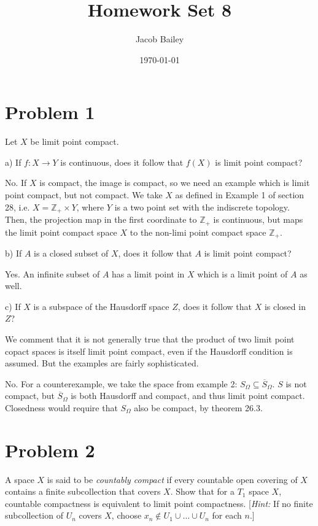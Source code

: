 \documentclass[11pt]{article}
\author{Jacob Bailey}
\date{\today}
\title{Homework Set 8}
\begin{document}
\maketitle
\section{Problem 1}
\label{sec:org7a49c94}
Let \(X\) be limit point compact. 

a) If \(f: X\rightarrow Y\) is continuous, does it follow that \(f(X)\) is limit
point compact? 

No. If \(X\) is compact, the image is compact, so we need an example which is
limit point compact, but not compact. We take \(X\) as defined in Example 1 of
section 28, i.e. \(X = \mathbb{Z}_+\times Y\), where \(Y\) is a two point set with
the indiscrete topology. Then, the projection map in the first coordinate to
\(\mathbb{Z}_+\) is continuous, but maps the limit point compact space \(X\) to the
non-limi point compact space \(\mathbb{Z}_+\). 

b) If \(A\) is a closed subset of \(X\), does it follow that \(A\) is limit point
compact? 

Yes. An infinite subset of \(A\) has a limit point in \(X\) which is a limit point
of \(A\) as well. 

c) If \(X\) is a subspace of the Hausdorff space \(Z\), does it follow that \(X\) is
closed in \(Z\)? 

We comment that it is not generally true that the product of two limit point
copact spaces is itself limit point compact, even if the Hausdorff condition is
assumed. But the examples are fairly sophisticated. 

No. For a counterexample, we take the space from example 2: \(S_{\Omega}\subseteq
\overline{S}_{\Omega}\). \(S\) is not compact, but \(\overline{S}_{\Omega}\) is both
Hausdorff and compact, and thus limit point compact. Closedness would require
that \(S_{\Omega}\) also be compact, by theorem 26.3. 

\section{Problem 2}
\label{sec:org378247b}
A space \(X\) is said to be \textit{countably compact} if every countable open
covering of \(X\) contains a finite subcollection that covers \(X\). Show that for a
\(T_1\) space \(X\), countable compactness is equivalent to limit point compactness. 
[\textit{Hint:} If no finite subcollection of \(U_n\) covers \(X\), choose \(x_n
\not\in U_1\cup\ldots\cup U_n\) for each \(n\).]
\end{document}
